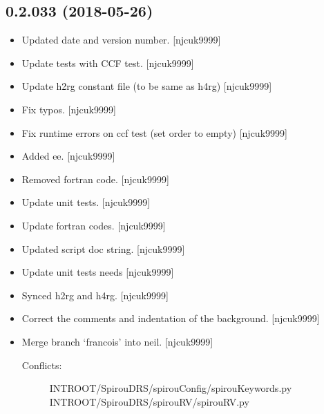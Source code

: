 \documentclass[a4paper,10pt,english]{report}
\begin{document}
\subsection{0.2.033 (2018-05-26)}
\label{\detokenize{misc/changelog:id430}}\begin{itemize}
\item {} 
Updated date and version number. {[}njcuk9999{]}

\item {} 
Update tests with CCF test. {[}njcuk9999{]}

\item {} 
Update h2rg constant file (to be same as h4rg) {[}njcuk9999{]}

\item {} 
Fix typos. {[}njcuk9999{]}

\item {} 
Fix runtime errors on ccf test (set order to empty) {[}njcuk9999{]}

\item {} 
Added ee. {[}njcuk9999{]}

\item {} 
Removed fortran code. {[}njcuk9999{]}

\item {} 
Update unit tests. {[}njcuk9999{]}

\item {} 
Update fortran codes. {[}njcuk9999{]}

\item {} 
Updated script doc string. {[}njcuk9999{]}

\item {} 
Update unit tests  needs  {[}njcuk9999{]}

\item {} 
Synced h2rg and h4rg. {[}njcuk9999{]}

\item {} 
Correct the comments and indentation of the background. {[}njcuk9999{]}

\item {} 
Merge branch ‘francois’ into neil. {[}njcuk9999{]}
\begin{description}
\item[{Conflicts:}] \leavevmode
INTROOT/SpirouDRS/spirouConfig/spirouKeywords.py
INTROOT/SpirouDRS/spirouRV/spirouRV.py


\end{description}
\end{itemize}
\end{document}
